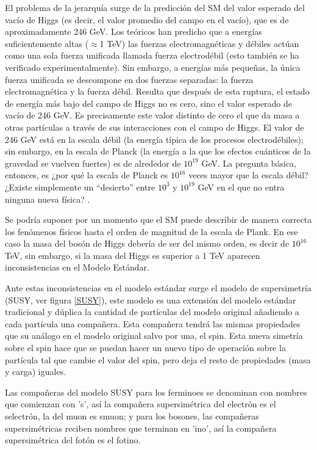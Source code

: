 \documentclass[journal]{IEEEtran}
\begin{document}
El problema de la jerarquía surge de la predicción del SM del valor esperado del vacío de Higgs (es decir, el valor promedio del campo en el vacío), que es de aproximadamente 246 GeV. Los teóricos han predicho que a energías suficientemente altas ($\approx$1 TeV) las fuerzas electromagnéticas y débiles actúan como una sola fuerza unificada llamada fuerza electrodébil (esto también se ha verificado experimentalmente). Sin embargo, a energías más pequeñas, la única fuerza unificada se descompone en dos fuerzas separadas: la fuerza electromagnética y la fuerza débil. Resulta que después de esta ruptura, el estado de energía más bajo del campo de Higgs no es cero, sino el valor esperado de vacío de 246 GeV. Es precisamente este valor distinto de cero el que da masa a otras partículas a través de sus interacciones con el campo de Higgs. El valor de 246 GeV está en la escala débil (la energía típica de los procesos electrodébiles); sin embargo, en la escala de Planck (la energía a la que los efectos cuánticos de la gravedad se vuelven fuertes) es de alrededor de $10^{19}$ GeV. La pregunta básica, entonces, es ¿por qué la escala de Planck es $10^{16}$ veces mayor que la escala débil? ¿Existe simplemente un ``desierto'' entre $10^{3}$ y $10^{19}$ GeV en el que no entra ninguna nueva física? \cite{K. Garrett}.

Se podría suponer por un momento que el SM  puede describir de manera correcta los fenómenos físicos hasta el orden de magnitud de la escala de Plank. En ese caso la masa del bosón de Higgs debería de ser del mismo orden, es decir de $10^{16}$ TeV, sin embargo, si la masa del Higgs es superior a 1 TeV aparecen inconsistencias en el Modelo Estándar.\hspace{.2cm}\cite{P. Gonzales}

Ante estas inconsistencias en el modelo estándar surge el modelo de supersimetría (SUSY, ver figura \ref{SUSY}), este modelo es una extensión del modelo estándar tradicional y dúplica la cantidad de partículas del modelo original añadiendo a cada partícula una compañera. Esta compañera tendrá las mismas propiedades que su análogo en el modelo original salvo por una, el spin. Esta nueva simetría sobre el spin hace que se puedan hacer un nuevo tipo de operación sobre la partícula tal que cambie el valor del spin, pero deja el resto de propiedades (masa y carga) iguales.

Las compañeras del modelo SUSY para los ferminoes se denominan con nombres que comienzan con 's', así la compañera supersimétrica del electrón es el selectrón, la del muon es smuon; y para los bosones, las compañeras supersimétricas reciben nombres que terminan en 'ino', así la compañera supersimétrica del fotón es el fotino.
\end{document}
